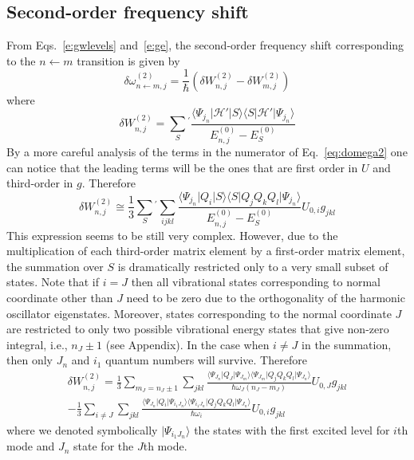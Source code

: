 \documentclass[a4paper,titlepage,twoside,fleqn,12pt]{book}
\begin{document}
\begin{refsection}
\subsection{Second-order frequency shift}

From Eqs.~\eqref{e:gwlevels} and~\eqref{e:ge}, the second-order 
frequency shift corresponding to the $n\leftarrow m$ transition 
is given by
%
\begin{equation}\label{e:dw-second-order-pt}
\delta \omega_{n\leftarrow m,j}^{(2)} = 
\frac{1}{\hbar} 
\left( \delta W_{n,j}^{(2)} - \delta W_{m,j}^{(2)} \right)
\end{equation}
%
where
%
\begin{equation}\label{eq:domega2}
\delta W_{n,j}^{(2)} = \sum_{S}{^{'}}
\frac{
   \langle \Psi_{j_n} \vert \mathscr{H}' \vert S          \rangle
   \langle S          \vert \mathscr{H}' \vert \Psi_{j_n} \rangle
}{E^{(0)}_{n,j} - E^{(0)}_S}
\end{equation}
%
By a more careful analysis of the terms in the numerator of
Eq.~\eqref{eq:domega2} one can notice that the leading terms
will be the ones that are first order in $U$ and third-order 
in $g$. Therefore 
%
\begin{equation}\label{eq:domega2approx}
\delta W_{n,j}^{(2)} \cong 
\frac{1}{3}
\sum_{S}{^{'}}
\sum_{ijkl}
\frac{
   \langle \Psi_{j_n} \vert Q_i \vert S          \rangle
   \langle S          \vert Q_jQ_kQ_l \vert \Psi_{j_n}  \rangle
}{E^{(0)}_{n,j} - E^{(0)}_S} U_{0,i} g_{jkl}
\end{equation}
%
This expression seems to be still very complex. However, due to the multiplication of each 
third-order matrix element by a first-order matrix element, the summation
over $S$ is dramatically restricted only to a very small subset of states.
Note that if $i=J$ then all vibrational states corresponding to normal coordinate
other than $J$ need to be zero due to the orthogonality of the harmonic oscillator
eigenstates. Moreover, states corresponding to the normal coordinate $J$ are restricted 
to only two possible
vibrational energy states that give non-zero integral, i.e., $n_J \pm 1$ (see Appendix).
In the case when $i\ne J$ in the summation, then only $J_n$ and $i_1$ quantum numbers will 
survive. Therefore
%
\begin{multline}  \label{eq:1x3}
\delta W_{n,j}^{(2)} =
\frac{1}{3}
\sum_{m_J= n_J \pm 1} 
\sum_{jkl}
\frac{
   \langle \Psi_{J_n} \vert Q_J \vert \Psi_{J_m}          \rangle
   \langle \Psi_{J_m} \vert Q_jQ_kQ_l \vert \Psi_{J_n}  \rangle
}{\hbar \omega_J (n_J-m_J) } U_{0,J} g_{jkl}                    \\
%
- \frac{1}{3}
\sum_{i\ne J}
\sum_{jkl}
\frac{
   \langle \Psi_{J_n} \vert Q_i \vert \Psi_{i_1J_n}          \rangle
   \langle \Psi_{i_1J_n} \vert Q_jQ_kQ_l \vert \Psi_{J_n}  \rangle
}{\hbar \omega_i } U_{0,i} g_{jkl}                    
\qquad
\end{multline}
%
where we denoted symbolically $\vert \Psi_{i_1J_n} \rangle$ the states 
with the first excited level for $i$th mode and $J_n$ state for the $J$th mode.


\end{refsection}
\end{document}

